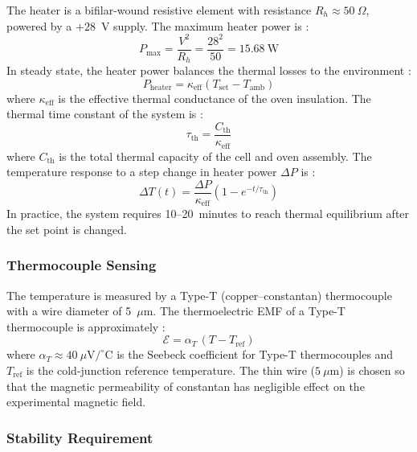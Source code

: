 The heater is a bifilar-wound resistive element with resistance $R_h \approx 50\ \Omega$,
powered by a $+28$~V supply. The maximum heater power is :
\begin{equation}
    P_{\text{max}} = \frac{V^2}{R_h} = \frac{28^2}{50} = 15.68\ \text{W}
\end{equation}
In steady state, the heater power balances the thermal losses to the environment :
\begin{equation}
    P_{\text{heater}} = \kappa_{\text{eff}}\left(T_{\text{set}} - T_{\text{amb}}\right)
\end{equation}
where $\kappa_{\text{eff}}$ is the effective thermal conductance of the oven insulation.
The thermal time constant of the system is :
\begin{equation}
    \tau_{\text{th}} = \frac{C_{\text{th}}}{\kappa_{\text{eff}}}
\end{equation}
where $C_{\text{th}}$ is the total thermal capacity of the cell and oven assembly. The
temperature response to a step change in heater power $\Delta P$ is :
\begin{equation}
    \Delta T(t) = \frac{\Delta P}{\kappa_{\text{eff}}}
    \left(1 - e^{-t/\tau_{\text{th}}}\right)
\end{equation}
In practice, the system requires 10--20~minutes to reach thermal equilibrium after the
set point is changed.

\subsubsection*{Thermocouple Sensing}

The temperature is measured by a Type-T (copper--constantan) thermocouple with a
wire diameter of 5~$\mu$m. The thermoelectric EMF of a Type-T thermocouple is
approximately :
\begin{equation}
    \mathcal{E} = \alpha_T\,(T - T_{\text{ref}})
\end{equation}
where $\alpha_T \approx 40\ \mu\text{V}/^\circ\text{C}$ is the Seebeck coefficient for
Type-T thermocouples and $T_{\text{ref}}$ is the cold-junction reference temperature.
The thin wire ($5\ \mu$m) is chosen so that the magnetic permeability of constantan has
negligible effect on the experimental magnetic field.

\subsubsection*{Stability Requirement}

